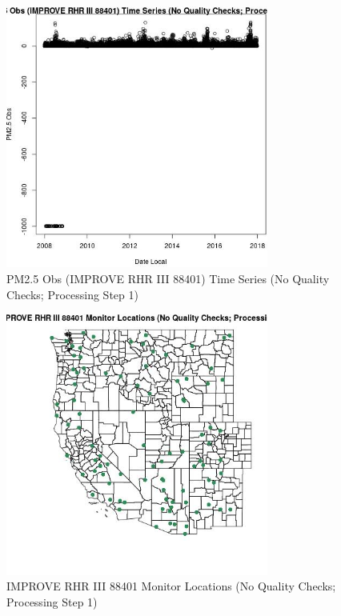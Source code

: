 
\begin{figure} 
\centering  
\includegraphics[width=0.77\textwidth]{Code_Outputs/PM25Source7TSstep1_PM25_ObsvDate_Local.jpg} 
\caption{\label{fig:PM25Source7TSstep1PM25_ObsvDate_Local}PM2.5 Obs (IMPROVE RHR III 88401) Time Series (No Quality Checks; Processing Step 1)} 
\end{figure} 
 

\begin{figure} 
\centering  
\includegraphics[width=0.77\textwidth]{Code_Outputs/PM25Source7TSstep1_MapIMPRHRIII88401Locations.jpg} 
\caption{\label{fig:PM25Source7TSstep1MapIMPRHRIII88401Locations}IMPROVE RHR III 88401 Monitor Locations (No Quality Checks; Processing Step 1)} 
\end{figure} 
 
